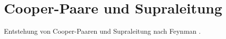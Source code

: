 \chapter{Cooper-Paare und Supraleitung\label{chapter:supraleitung}}
\begin{refsection}

Entstehung von Cooper-Paaren und Supraleitung nach Feynman
\cite{supraleitung:feynman}.

\printbibliography[heading=subbibliography]
\end{refsection}

